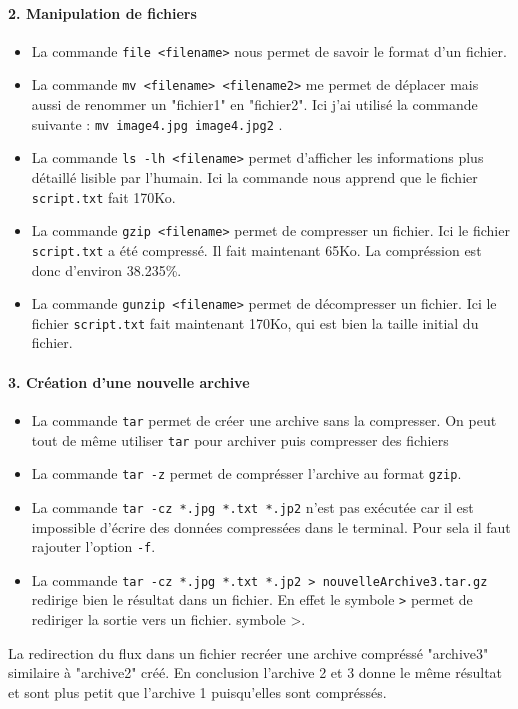 \paragraph{2. Manipulation de fichiers}
\begin{itemize}
\item La commande \texttt{file <filename>} nous permet de savoir le format d'un fichier.
\item La commande \texttt{mv <filename> <filename2>} me permet de déplacer mais aussi de renommer un "fichier1" en "fichier2". Ici j'ai utilisé la commande suivante : \texttt{mv image4.jpg image4.jpg2} .
\item La commande \texttt{ls -lh <filename>} permet d'afficher les informations plus détaillé lisible par l'humain. Ici la commande nous apprend que le fichier \texttt{script.txt} fait 170Ko.
\item La commande \texttt{gzip <filename>} permet de compresser un fichier. Ici le fichier \texttt{script.txt} a été compressé. Il fait maintenant  65Ko. La compréssion est donc d'environ 38.235\%.
\item La commande \texttt{gunzip <filename>} permet de décompresser un fichier. Ici le fichier \texttt{script.txt} fait maintenant 170Ko, qui est bien la taille initial du fichier.
\end{itemize}

\paragraph{3. Création d'une nouvelle archive}
\begin{itemize}
\item La commande \texttt{tar} permet de créer une archive sans la compresser. On peut tout de même utiliser \texttt{tar} pour archiver puis compresser des fichiers
\item La commande \texttt{tar -z} permet de comprésser l'archive au format \texttt{gzip}.
\item La commande \texttt{tar -cz *.jpg *.txt *.jp2} n'est pas exécutée car il est impossible d’écrire des données compressées dans le terminal. Pour sela il faut rajouter l'option \texttt{-f}.
\item La commande \texttt{tar -cz *.jpg *.txt *.jp2 > nouvelleArchive3.tar.gz} redirige bien le résultat dans un fichier. En effet le symbole \texttt{>} permet de rediriger la sortie vers un fichier.
symbole >.
\end{itemize}
La redirection du flux dans un fichier recréer une archive compréssé "archive3" similaire à "archive2"  créé.
En conclusion l'archive 2 et 3 donne le même résultat et sont plus petit que l'archive 1 puisqu'elles sont compréssés.

